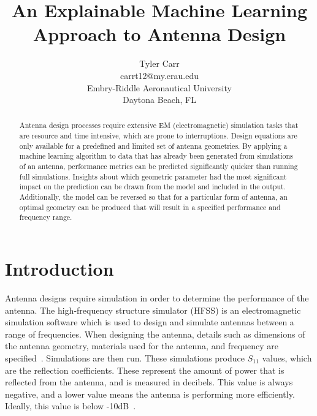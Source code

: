 \documentclass[lettersize,journal]{IEEEtran}
\begin{document}
\title{An Explainable Machine Learning Approach to Antenna Design}

\author{Tyler Carr \\ carrt12@my.erau.edu \\ Embry-Riddle Aeronautical University \\ Daytona Beach, FL}

\maketitle

\begin{abstract}
Antenna design processes require extensive EM (electromagnetic) simulation tasks that are resource and time intensive, which are prone to interruptions. Design equations are only available for a predefined and limited set of antenna geometries. By applying a machine learning algorithm to data that has already been generated from simulations of an antenna, performance metrics can be predicted significantly quicker than running full simulations. Insights about which geometric parameter had the most significant impact on the prediction can be drawn from the model and included in the output. Additionally, the model can be reversed so that for a particular form of antenna, an optimal geometry can be produced that will result in a specified performance and frequency range. 
\end{abstract}

\section{Introduction}
Antenna designs require simulation in order to determine the performance of the antenna. The high-frequency structure simulator (HFSS) is an electromagnetic simulation software which is used to design and simulate antennas between a range of frequencies. When designing the antenna, details such as dimensions of the antenna geometry, materials used for the antenna, and frequency are specified~\cite{Maxworth_2022}. Simulations are then run. These simulations produce $S_{11}$ values, which are the reflection coefficients. These represent the amount of power that is reflected from the antenna, and is measured in decibels. This value is always negative, and a lower value means the antenna is performing more efficiently. Ideally, this value is below -10dB~\cite{Bevelacqua_2015}.
\end{document}
